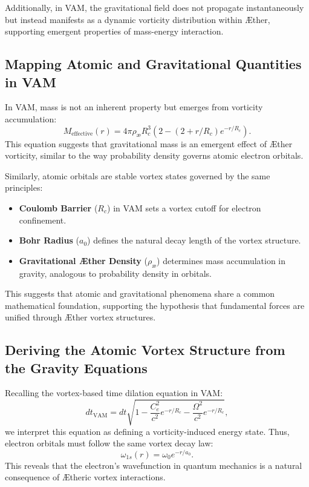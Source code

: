 Additionally, in VAM, the gravitational field does not propagate instantaneously but instead manifests as a dynamic vorticity distribution within Æther, supporting emergent properties of mass-energy interaction.


\subsection*{Mapping Atomic and Gravitational Quantities in VAM}


In VAM, mass is not an inherent property but emerges from vorticity accumulation:
\begin{equation*}
M_\text{effective}(r) = 4\pi \rho_\text{\ae} R_c^3 \left( 2 - (2 + r/R_c) e^{-r / R_c} \right).
\end{equation*}
This equation suggests that gravitational mass is an emergent effect of Æther vorticity, similar to the way probability density governs atomic electron orbitals.


Similarly, atomic orbitals are stable vortex states governed by the same principles:
\begin{itemize}
\item \textbf{Coulomb Barrier} ($R_c$) in VAM sets a vortex cutoff for electron confinement.
\item \textbf{Bohr Radius} ($a_0$) defines the natural decay length of the vortex structure.
\item \textbf{Gravitational Æther Density} ($\rho_\text{\ae}$) determines mass accumulation in gravity, analogous to probability density in orbitals.
\end{itemize}
This suggests that atomic and gravitational phenomena share a common mathematical foundation, supporting the hypothesis that fundamental forces are unified through Æther vortex structures.


\subsection*{Deriving the Atomic Vortex Structure from the Gravity Equations}


Recalling the vortex-based time dilation equation in VAM:
\begin{equation*}
dt_\text{VAM} = dt \sqrt{1 - \frac{C_e^2}{c^2} e^{-r/R_c} - \frac{\Omega^2}{c^2} e^{-r/R_c}},
\end{equation*}
we interpret this equation as defining a vorticity-induced energy state. Thus, electron orbitals must follow the same vortex decay law:
\begin{equation*}
\omega_{1s}(r) = \omega_0 e^{-r/a_0}.
\end{equation*}
This reveals that the electron's wavefunction in quantum mechanics is a natural consequence of Ætheric vortex interactions.


